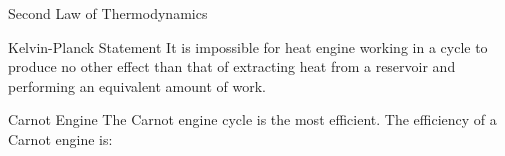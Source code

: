 \documentclass[12pt,aspectratio=169]{beamer}
\begin{document}
\begin{frame}{Second Law of Thermodynamics}
  \begin{block}{Kelvin-Planck Statement}
    It is impossible for heat engine working in a cycle to produce no other
    effect than that of extracting heat from a reservoir and performing an
    equivalent amount of work.
  \end{block}
\end{frame}



\begin{frame}{Carnot Engine}
  The Carnot engine cycle is the most efficient.
  The efficiency of a Carnot engine is:
  
\end{frame}
\end{document}
